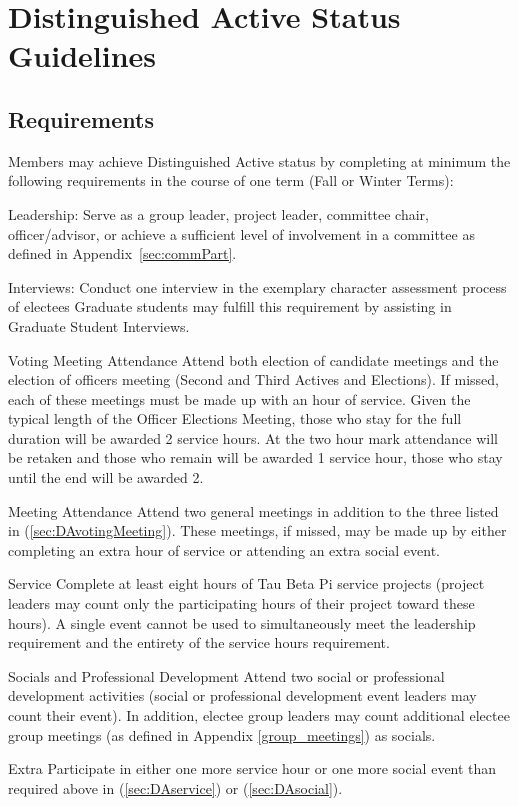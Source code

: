 \chapter{Distinguished Active Status Guidelines}\label{sec:DAstatus}
\section{Requirements} Members may achieve Distinguished Active status by completing at minimum the following requirements in the course of one term (Fall or Winter Terms):
\begin{enumsubsection}
\item{Leadership:} Serve as a group leader, project leader, committee chair,  officer/advisor, or achieve a sufficient level of involvement in a committee as defined in Appendix~\ref{sec:commPart}.
\item{Interviews:} Conduct one interview in the exemplary character assessment process of electees  Graduate students may fulfill this requirement by assisting in Graduate Student Interviews.
\item{Voting Meeting Attendance}\label{sec:DAvotingMeeting} Attend both election of candidate meetings and the election of officers meeting (Second and Third Actives and Elections). If missed, each of these meetings must be made up with an hour of service. Given the typical length of the Officer Elections Meeting, those who stay for the full duration will be awarded 2 service hours. At the two hour mark attendance will be retaken and those who remain will be awarded 1 service hour, those who stay until the end will be awarded 2.
\item{Meeting Attendance} Attend two general meetings in addition to the three listed in (\ref{sec:DAvotingMeeting}). These meetings, if missed, may be made up by either completing an extra hour of service or attending an extra social event.
\item{Service}\label{sec:DAservice} Complete at least eight hours of Tau Beta Pi service projects (project leaders may count only the participating hours of their project toward these hours). A single event cannot be used to simultaneously meet the leadership requirement and the entirety of the service hours requirement.
\item{Socials and Professional Development} \label{sec:DAsocial}Attend two social or professional development activities (social or professional development event leaders may count their event). In addition, electee group leaders may count additional electee group meetings (as defined in Appendix \ref{group_meetings}) as socials.
\item{Extra} Participate in either one more service hour or one more social event than required above in (\ref{sec:DAservice}) or (\ref{sec:DAsocial}).

\end{enumsubsection}
